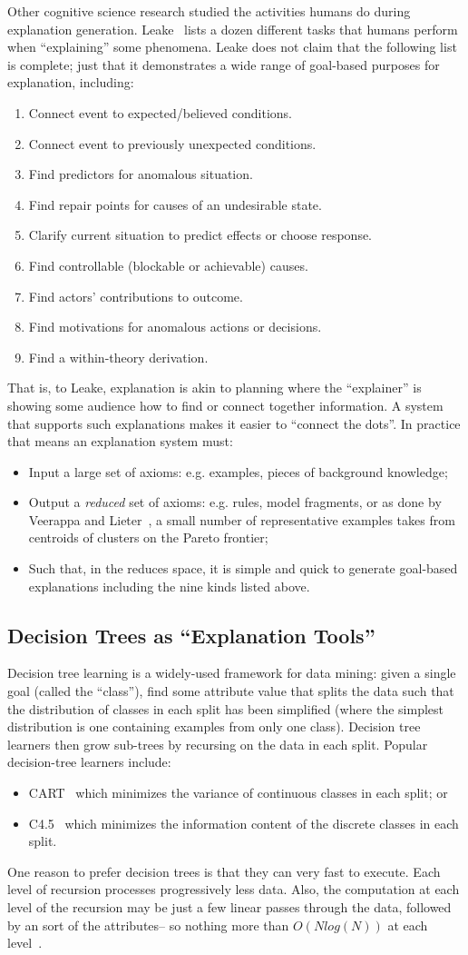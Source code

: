 \documentclass[runningheads]{llncs}
\newcommand{\bi}{\begin{itemize}}
\newcommand{\ei}{\end{itemize}}
\newcommand{\be}{\begin{enumerate}}
\newcommand{\ee}{\end{enumerate}}
\begin{document}
Other  cognitive science research studied the activities
humans do during explanation generation.
Leake~\cite{leake91}
lists a dozen different tasks that humans perform when 
``explaining'' some phenomena. Leake does not claim
that the following list is complete; just that
it demonstrates  a wide range of
goal-based purposes for explanation, including:
\be
\item
Connect event to expected/believed conditions.
\item
Connect event to previously unexpected conditions.
\item
Find predictors for anomalous situation.
\item
Find repair points for causes of an undesirable state.
\item
Clarify current situation to predict effects or choose response.
\item
Find controllable (blockable or achievable) causes.
\item
Find actors’ contributions to outcome.
\item
Find motivations for anomalous actions or decisions.
\item
Find a within-theory derivation.
\ee
That is, to Leake, explanation is akin to planning
where the ``explainer'' is showing some audience how to 
find or connect together information.
A system that supports such explanations makes it easier
to ``connect the dots''. In practice that means an explanation system
must:
\bi
\item Input a large set of axioms: e.g. examples, pieces of background knowledge;
\item Output a {\em reduced} set of axioms:
e.g. rules, model fragments,
or as done by Veerappa and Lieter~\cite{veerappa11}, a small number
of representative examples takes from centroids of clusters on the Pareto
frontier;
\item Such that, in the reduces space, it is simple and quick to generate
goal-based explanations including the nine kinds listed above.
\ei
\subsection{Decision Trees as ``Explanation Tools''}
Decision tree learning is a widely-used framework for data mining: given a single goal
(called the ``class''), find some attribute value that splits the data such
that the distribution of classes in each split has been simplified
(where the simplest distribution is one containing examples from only one class).
Decision tree learners then grow sub-trees by recursing on the data in  each split. 
Popular decision-tree learners include:
\bi
\item CART~\cite{breiman84,} which  minimizes the variance of continuous classes in each split; or
\item C4.5~\cite{quinlan92} which minimizes the information content of the discrete classes in each split.
\ei
One reason to prefer decision trees is that they can very fast to
execute. Each level of recursion
processes progressively less data. Also, the computation at each level of the recursion
may be just a few linear passes through the data, followed by an
sort of the attributes-- so nothing more than $O(Nlog(N))$ at each level~\cite{witten11}.
\end{document}
